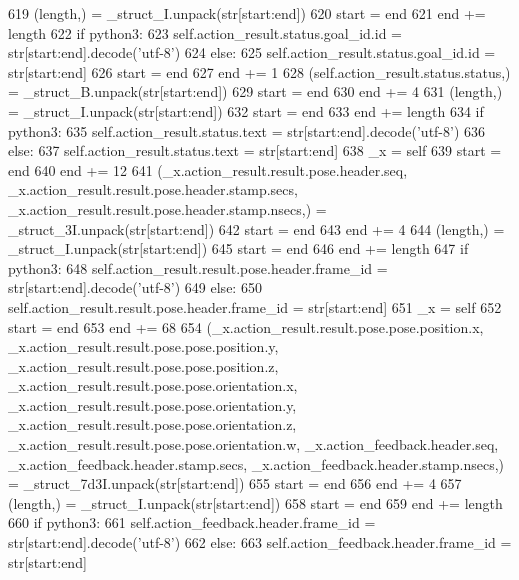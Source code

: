 \begin{DoxyCode}
619       (length,) = \_struct\_I.unpack(str[start:end])
620       start = end
621       end += length
622       \textcolor{keywordflow}{if} python3:
623         self.action\_result.status.goal\_id.id = str[start:end].decode(\textcolor{stringliteral}{'utf-8'})
624       \textcolor{keywordflow}{else}:
625         self.action\_result.status.goal\_id.id = str[start:end]
626       start = end
627       end += 1
628       (self.action\_result.status.status,) = \_struct\_B.unpack(str[start:end])
629       start = end
630       end += 4
631       (length,) = \_struct\_I.unpack(str[start:end])
632       start = end
633       end += length
634       \textcolor{keywordflow}{if} python3:
635         self.action\_result.status.text = str[start:end].decode(\textcolor{stringliteral}{'utf-8'})
636       \textcolor{keywordflow}{else}:
637         self.action\_result.status.text = str[start:end]
638       \_x = self
639       start = end
640       end += 12
641       (\_x.action\_result.result.pose.header.seq, \_x.action\_result.result.pose.header.stamp.secs, 
      \_x.action\_result.result.pose.header.stamp.nsecs,) = \_struct\_3I.unpack(str[start:end])
642       start = end
643       end += 4
644       (length,) = \_struct\_I.unpack(str[start:end])
645       start = end
646       end += length
647       \textcolor{keywordflow}{if} python3:
648         self.action\_result.result.pose.header.frame\_id = str[start:end].decode(\textcolor{stringliteral}{'utf-8'})
649       \textcolor{keywordflow}{else}:
650         self.action\_result.result.pose.header.frame\_id = str[start:end]
651       \_x = self
652       start = end
653       end += 68
654       (\_x.action\_result.result.pose.pose.position.x, \_x.action\_result.result.pose.pose.position.y, 
      \_x.action\_result.result.pose.pose.position.z, \_x.action\_result.result.pose.pose.orientation.x, 
      \_x.action\_result.result.pose.pose.orientation.y, \_x.action\_result.result.pose.pose.orientation.z, 
      \_x.action\_result.result.pose.pose.orientation.w, \_x.action\_feedback.header.seq, \_x.action\_feedback.header.stamp.secs, 
      \_x.action\_feedback.header.stamp.nsecs,) = \_struct\_7d3I.unpack(str[start:end])
655       start = end
656       end += 4
657       (length,) = \_struct\_I.unpack(str[start:end])
658       start = end
659       end += length
660       \textcolor{keywordflow}{if} python3:
661         self.action\_feedback.header.frame\_id = str[start:end].decode(\textcolor{stringliteral}{'utf-8'})
662       \textcolor{keywordflow}{else}:
663         self.action\_feedback.header.frame\_id = str[start:end]

\end{DoxyCode}
